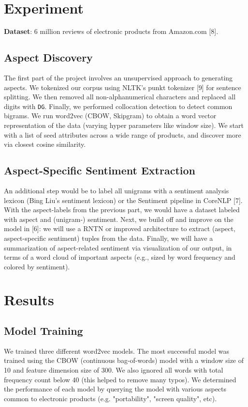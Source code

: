 \documentclass{article} %
\begin{document}
\section{Experiment} 

\textbf{Dataset}: 6 million reviews of electronic products from Amazon.com [8].



\subsection{Aspect Discovery}

The first part of the project involves an unsupervised approach to generating aspects. We tokenized our corpus using NLTK's punkt tokenizer [9] for sentence splitting. We then removed all non-alphanumerical characters and replaced all digits with \texttt{DG}. Finally, we performed collocation detection to detect common bigrams. We run word2vec (CBOW, Skipgram) to obtain a word vector representation of the data (varying hyper parameters like window size). We start with a list of seed attributes across a wide range of products, and discover more via closest cosine similarity.

\subsection{Aspect-Specific Sentiment Extraction}

An additional step would be to label all unigrams with a sentiment analysis lexicon (Bing Liu's sentiment lexicon) or the Sentiment pipeline in CoreNLP [7]. With the aspect-labels from the previous part, we would have a dataset labeled with aspect and (unigram-) sentiment. Next, we build off and improve on the model in [6]: we will use a RNTN or improved architecture to extract (aspect, aspect-specific sentiment) tuples from the data. Finally, we will have a summarization of aspect-related sentiment via visualization of our output, in terms of a word cloud of important aspects (e.g., sized by word frequency and colored by sentiment). 






\section{Results}

\subsection{Model Training} We trained three different word2vec models. The most successful model was trained using the CBOW (continuous bag-of-words) model with a window size of 10 and feature dimension size of 300. We also ignored all words with total frequency count below 40 (this helped to remove many typos). We determined the performance of each model by querying the model with various aspects common to electronic products (e.g. "portability", "screen quality", etc).
\end{document}
